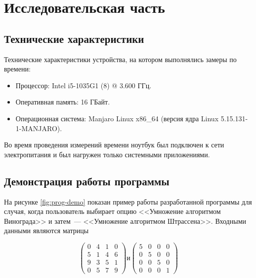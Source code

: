 \chapter{Исследовательская часть}

\section{Технические характеристики}

Технические характеристики устройства, на котором выполнялись замеры по времени:

\begin{itemize}
    \item Процессор: Intel i5-1035G1 (8) @ 3.600 ГГц.
    \item Оперативная память: 16 ГБайт.
    \item Операционная система: Manjaro Linux x86\_64 (версия ядра Linux 5.15.131-1-MANJARO).
\end{itemize}

Во время проведения измерений времени ноутбук был подключен к сети электропитания и был нагружен только системными приложениями.

\section{Демонстрация работы программы}

На рисунке \ref{fig:prog-demo} показан пример работы разработанной программы для случая, когда пользователь выбирает опцию <<Умножение алгоритмом Винограда>> и затем~--- <<Умножение алгоритмом Штрассена>>.
Входными данными являются матрицы

\[
\begin{pmatrix}
    0 & 4 & 1 & 0 \\
    5 & 1 & 4 & 6 \\
    9 & 3 & 5 & 1 \\
    0 & 5 & 7 & 9
\end{pmatrix}
\text{и}
\begin{pmatrix}
    5 & 0 & 0 & 0 \\
    0 & 5 & 0 & 0 \\
    0 & 0 & 5 & 0 \\
    0 & 0 & 0 & 1
\end{pmatrix}
\]


